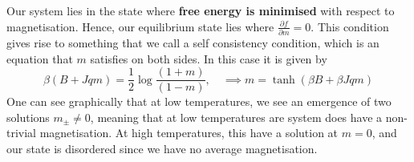 Our system lies in the state where \textbf{free energy is minimised} with respect to magnetisation. Hence, our equilibrium state lies where $\frac{ \partial f }{ \partial m }  = 0 $. 
This condition gives rise to something that we call a self consistency condition, which is an equation that $m$ satisfies on both sides. In this case it is given by 
\[ 
	\beta ( B + Jqm ) = \frac{ 1}{2} \log \frac{ ( 1+ m )}{ ( 1- m ) }, \quad \implies m = \tanh ( \beta B + \beta J q m ) \]
One can see graphically that at low temperatures, we see an emergence of two solutions $m_{ \pm  } \neq 0$, meaning that at low temperatures are system does have a non-trivial magnetisation. At high temperatures, this have a solution at $m = 0$, and our state is disordered since we have no average magnetisation. 
 
